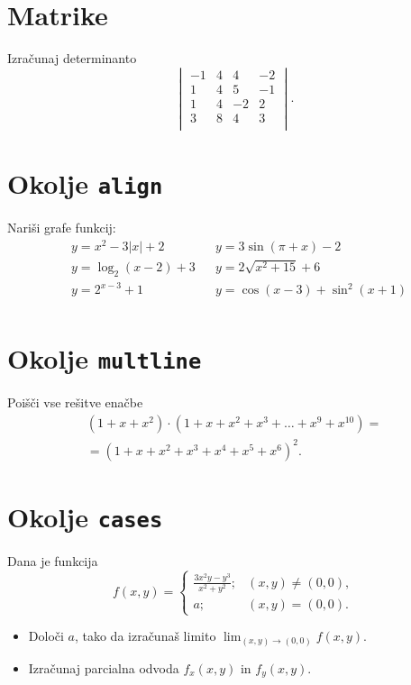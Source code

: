 \documentclass[a4paper,12pt]{article}
\begin{document}
\section*{Matrike}
Izračunaj determinanto
\[
\begin{vmatrix}
   -1 & 4 & 4 & -2 \\
    1 & 4 & 5 & -1 \\
    1 & 4 & -2 & 2 \\
    3 & 8 & 4 & 3 \\
\end{vmatrix}.\]

\section*{Okolje \texttt{align}}
Nariši grafe funkcij:
\begin{align*}
   &y = x^2 - 3|x| + 2  &  &y = 3 \sin(\pi+x) - 2\\
   &y = \log_2(x-2) + 3  & &y = 2 \sqrt{x^2+15} + 6\\
   &y = 2^{x-3} + 1     &  &y = \cos(x-3) + \sin^2(x+1)\\
\end{align*}

\section*{Okolje \texttt{multline}}
Poišči vse rešitve enačbe
\begin{multline*}
(1+x+x^2) \cdot (1+x+x^2+x^3+\ldots+x^9+x^{10}) =\\
=(1+x+x^2+x^3+x^4+x^5+x^6)^2.
\end{multline*}


\section*{Okolje \texttt{cases}}
Dana je funkcija
\[ f(x,y)=
\begin{cases}
      \frac{3x^2y-y^3}{x^2+y^2}; &(x,y) \ne (0,0),\\
         a; &(x,y)=(0,0).
\end{cases}
 \]

\begin{itemize}
\item Določi \(a\), tako da izračunaš limito \( \lim_{(x,y)\to(0,0)} f(x,y) \).
\item Izračunaj parcialna odvoda \(f_x(x,y)\) in \(f_y(x,y)\).
\end{itemize}
\end{document}
